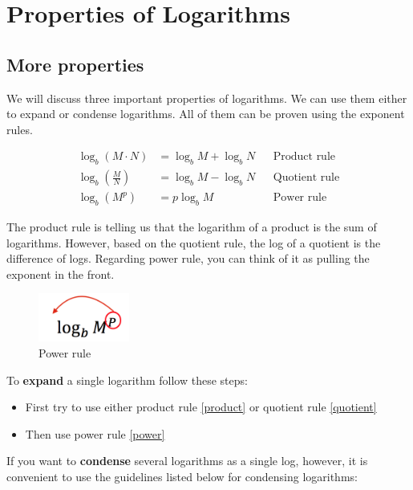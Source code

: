 \chapter{Properties of Logarithms}
\section{More properties}
We will discuss three important properties of logarithms. We can use them either to 
expand or condense logarithms. All of them can be proven using the exponent rules.
\begin{tcolorbox}[title= Rules of Logarithms, fonttitle=\bfseries, 
                  colframe=blue!70!black,colback=blue!5!white]
	\begin{align}
		\log_{b}(M\cdot N)&=\log_{b}M + \log_{b}N &	&\text{Product rule} \label{product}\\
		\log_{b}\left(\frac{M}{N}\right)&=\log_{b}M - \log_{b}N &	&\text{Quotient rule}\label{quotient}\\
		\log_{b}(M^{p})&=p\log_{b}M &	&\text{Power rule} \label{power}
	\end{align}
\end{tcolorbox}
\begin{nt} The product rule is telling us that the logarithm of a product is the sum of 
logarithms. However, based on the quotient rule, the log of a quotient is the difference 
of logs. Regarding power rule, you can think of it as pulling the exponent in the front.
\end{nt}
		\begin{figure}[H]
		 \includegraphics[width=3cm]{pics/power.png}
		 \centering
		 \caption{Power rule}
		\end{figure}
%
To \textbf{expand} a single logarithm follow these steps:
	\begin{itemize}
		\item First try to use either product rule \eqref{product} or quotient rule \eqref{quotient}	
		\item Then use power rule \eqref{power}
	\end{itemize}
%
    If you want to \textbf{condense} several logarithms as a single log, however, it is convenient to use the guidelines listed below for condensing logarithms:
